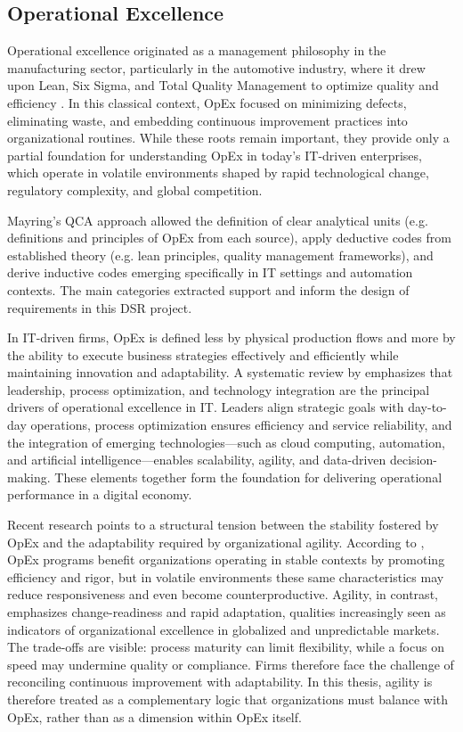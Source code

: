 \subsection{Operational Excellence}\label{subsec:op-ex}
Operational excellence originated as a management philosophy in the manufacturing sector, particularly in the automotive industry, where it drew upon Lean, Six Sigma, and Total Quality Management to optimize quality and efficiency \parencite{juranQuality1999, womackLean2013}. In this classical context, OpEx focused on minimizing defects, eliminating waste, and embedding continuous improvement practices into organizational routines. While these roots remain important, they provide only a partial foundation for understanding OpEx in today's IT-driven enterprises, which operate in volatile environments shaped by rapid technological change, regulatory complexity, and global competition.

Mayring's QCA approach allowed the definition of clear analytical units (e.g. definitions and principles of OpEx from each source), apply deductive codes from established theory (e.g. lean principles, quality management frameworks), and derive inductive codes emerging specifically in IT settings and automation contexts. The main categories extracted support and inform the design of requirements in this DSR project.

In IT-driven firms, OpEx is defined less by physical production flows and more by the ability to execute business strategies effectively and efficiently while maintaining innovation and adaptability. A systematic review by \textcite{owoadeSystematic2024} emphasizes that leadership, process optimization, and technology integration are the principal drivers of operational excellence in IT. Leaders align strategic goals with day-to-day operations, process optimization ensures efficiency and service reliability, and the integration of emerging technologies---such as cloud computing, automation, and artificial intelligence---enables scalability, agility, and data-driven decision-making. These elements together form the foundation for delivering operational performance in a digital economy.

Recent research points to a structural tension between the stability fostered by OpEx and the adaptability required by organizational agility. According to \textcite{carvalhoOperational2023}, OpEx programs benefit organizations operating in stable contexts by promoting efficiency and rigor, but in volatile environments these same characteristics may reduce responsiveness and even become counterproductive. Agility, in contrast, emphasizes change-readiness and rapid adaptation, qualities increasingly seen as indicators of organizational excellence in globalized and unpredictable markets. The trade-offs are visible: process maturity can limit flexibility, while a focus on speed may undermine quality or compliance. Firms therefore face the challenge of reconciling continuous improvement with adaptability. In this thesis, agility is therefore treated as a complementary logic that organizations must balance with OpEx, rather than as a dimension within OpEx itself.

